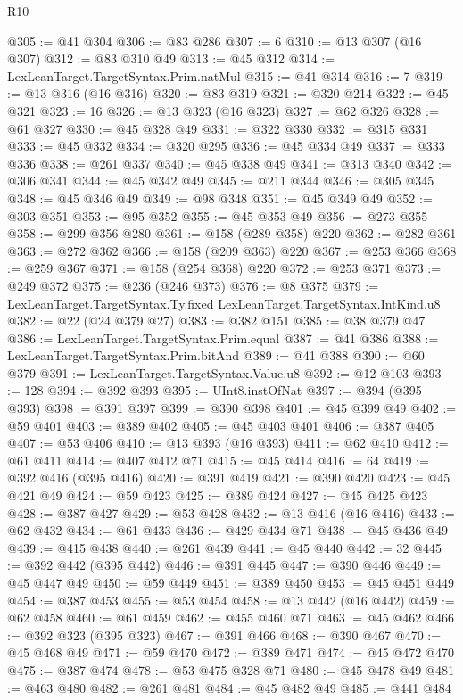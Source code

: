 \begin{lexlean}{R10}
\begin{coremodule}
@305 := @41 @304
@306 := @83 @286
@307 := 6
@310 := @13 @307 (@16 @307)
@312 := @83 @310 @49
@313 := @45 @312
@314 := LexLeanTarget.TargetSyntax.Prim.natMul
@315 := @41 @314
@316 := 7
@319 := @13 @316 (@16 @316)
@320 := @83 @319
@321 := @320 @214
@322 := @45 @321
@323 := 16
@326 := @13 @323 (@16 @323)
@327 := @62 @326
@328 := @61 @327
@330 := @45 @328 @49
@331 := @322 @330
@332 := @315 @331
@333 := @45 @332
@334 := @320 @295
@336 := @45 @334 @49
@337 := @333 @336
@338 := @261 @337
@340 := @45 @338 @49
@341 := @313 @340
@342 := @306 @341
@344 := @45 @342 @49
@345 := @211 @344
@346 := @305 @345
@348 := @45 @346 @49
@349 := @98 @348
@351 := @45 @349 @49
@352 := @303 @351
@353 := @95 @352
@355 := @45 @353 @49
@356 := @273 @355
@358 := @299 @356 @280
@361 := @158 (@289 @358) @220
@362 := @282 @361
@363 := @272 @362
@366 := @158 (@209 @363) @220
@367 := @253 @366
@368 := @259 @367
@371 := @158 (@254 @368) @220
@372 := @253 @371
@373 := @249 @372
@375 := @236 (@246 @373)
@376 := @8 @375
@379 := LexLeanTarget.TargetSyntax.Ty.fixed LexLeanTarget.TargetSyntax.IntKind.u8
@382 := @22 (@24 @379 @27)
@383 := @382 @151
@385 := @38 @379 @47
@386 := LexLeanTarget.TargetSyntax.Prim.equal
@387 := @41 @386
@388 := LexLeanTarget.TargetSyntax.Prim.bitAnd
@389 := @41 @388
@390 := @60 @379
@391 := LexLeanTarget.TargetSyntax.Value.u8
@392 := @12 @103
@393 := 128
@394 := @392 @393
@395 := UInt8.instOfNat
@397 := @394 (@395 @393)
@398 := @391 @397
@399 := @390 @398
@401 := @45 @399 @49
@402 := @59 @401
@403 := @389 @402
@405 := @45 @403 @401
@406 := @387 @405
@407 := @53 @406
@410 := @13 @393 (@16 @393)
@411 := @62 @410
@412 := @61 @411
@414 := @407 @412 @71
@415 := @45 @414
@416 := 64
@419 := @392 @416 (@395 @416)
@420 := @391 @419
@421 := @390 @420
@423 := @45 @421 @49
@424 := @59 @423
@425 := @389 @424
@427 := @45 @425 @423
@428 := @387 @427
@429 := @53 @428
@432 := @13 @416 (@16 @416)
@433 := @62 @432
@434 := @61 @433
@436 := @429 @434 @71
@438 := @45 @436 @49
@439 := @415 @438
@440 := @261 @439
@441 := @45 @440
@442 := 32
@445 := @392 @442 (@395 @442)
@446 := @391 @445
@447 := @390 @446
@449 := @45 @447 @49
@450 := @59 @449
@451 := @389 @450
@453 := @45 @451 @449
@454 := @387 @453
@455 := @53 @454
@458 := @13 @442 (@16 @442)
@459 := @62 @458
@460 := @61 @459
@462 := @455 @460 @71
@463 := @45 @462
@466 := @392 @323 (@395 @323)
@467 := @391 @466
@468 := @390 @467
@470 := @45 @468 @49
@471 := @59 @470
@472 := @389 @471
@474 := @45 @472 @470
@475 := @387 @474
@478 := @53 @475 @328 @71
@480 := @45 @478 @49
@481 := @463 @480
@482 := @261 @481
@484 := @45 @482 @49
@485 := @441 @484

\end{coremodule}
\end{lexlean}
